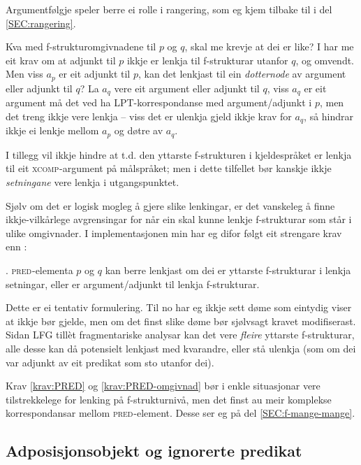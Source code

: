 \documentclass[12pt,a4paper,oneside,draft]{report}
\newcommand{\F}[2]{\textsc{#1}\ensuremath{_{#2}}}
\newcommand{\XCOMP}{\F{xcomp}{}}
\newcommand{\PRED}{\F{pred}{}}
\begin{document}
 Argumentfølgje speler berre ei rolle i rangering, som eg kjem tilbake
 til i del \ref{SEC:rangering}.

Kva med f\hyp{}strukturomgivnadene til $p$ og $q$, skal me krevje at dei er
like?  I \LLast[e] har me eit krav om at adjunkt til $p$ ikkje er
lenkja til f\hyp{}strukturar utanfor $q$, og omvendt. Men viss $a_p$ er eit
adjunkt til $p$, kan det lenkjast til ein \emph{dotternode} av argument
eller adjunkt til $q$? La $a_q$ vere eit argument eller adjunkt til
$q$, viss $a_q$ er eit argument må det ved \LLast ha LPT\hyp{}korrespondanse
med argument/adjunkt i $p$, men det treng ikkje vere lenkja -- viss
det er ulenkja gjeld ikkje krav \LLast for $a_q$, så \LLast hindrar
ikkje ei lenkje mellom $a_p$ og døtre av $a_q$. 

I tillegg vil ikkje \LLast hindre at t.d. den yttarste f\hyp{}strukturen i
kjeldespråket er lenkja til eit \XCOMP{}-argument på målspråket; men i
dette tilfellet bør kanskje ikkje \emph{setningane} vere lenkja i
utgangspunktet.

Sjølv om det er logisk mogleg å gjere slike lenkingar, er det
vanskeleg å finne ikkje-vilkårlege avgrensingar for når ein skal kunne
lenkje f\hyp{}strukturar som står i ulike omgivnader. I implementasjonen
min har eg difor følgt eit strengare krav enn \LLast[e]:

\ex. \label{krav:PRED-omgivnad} \PRED{}-elementa $p$ og $q$ kan berre
     lenkjast om dei er yttarste f\hyp{}strukturar i lenkja setningar, eller
     er argument/adjunkt til lenkja f\hyp{}strukturar.

Dette er ei tentativ formulering. Til no har eg ikkje sett døme som
 eintydig viser at \Last ikkje bør gjelde, men om det finst
 slike døme bør sjølvsagt kravet modifiserast. Sidan LFG tillèt
 fragmentariske analysar kan det vere \emph{fleire} yttarste
 f\hyp{}strukturar, alle desse kan då potensielt lenkjast med
 kvarandre, eller stå ulenkja (som om dei var adjunkt av eit predikat
 som sto utanfor dei).

Krav \ref{krav:PRED} og \ref{krav:PRED-omgivnad} bør i enkle
situasjonar vere tilstrekkelege for lenking på f\hyp{}strukturnivå, men
det finst au meir komplekse korrespondansar mellom \PRED{}-element. Desse
ser eg på del \ref{SEC:f-mange-mange}.


\subsection{Adposisjonsobjekt og ignorerte predikat}
\label{sec-3.6.4}
\end{document}
